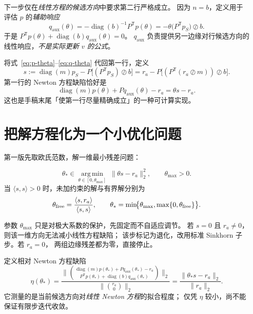 \documentclass[11pt,a4paper]{ctexart}
\newcommand{\diag}{\operatorname{diag}}
\newcommand{\trans}{\mathsf{T}}
\begin{document}
下一步仅在\emph{线性方程的候选方向}中要求第二行严格成立。
因为 $n=b$，定义用于评估 $p$ 的\emph{辅助响应}
\begin{equation}\label{eq:q-theta}
 q_{\mathrm{aux}}(\theta)=-\diag(b)^{-1}P^{\trans}p(\theta)
 =-\theta\bigl(P^{\trans}p_S\bigr)\oslash b.
\end{equation}
于是 $P^{\trans}p(\theta)+\diag(b)q_{\mathrm{aux}}(\theta)=0$。
$q_{\mathrm{aux}}$ 负责提供另一边缘对行候选方向的线性响应，\emph{不是实际更新 $v$ 的公式}。

将式~\eqref{eq:p-theta}--\eqref{eq:q-theta} 代回第一行，定义
\begin{equation}\label{eq:s}
 s:=\diag(m)p_S-P\bigl[(P^{\trans}p_S)\oslash b\bigr]
 =r_a-P\bigl[(P^{\trans}(r_a\oslash m))\oslash b\bigr].
\end{equation}
第一行的 Newton 方程缺陷恰好是
\begin{equation}\label{eq:defect}
 \diag(m)p(\theta)+Pq_{\mathrm{aux}}(\theta)-r_a
 =\theta s-r_a.
\end{equation}
这也是手稿末尾「使第一行尽量精确成立」的一种可计算实现。

\section{把解方程化为一个小优化问题}

第一版先取欧氏范数，解一维最小残差问题：
\begin{resultbox}
\begin{equation}\label{eq:ls}
 \boxed{\theta_*\in\underset{\theta\in[0,\theta_{\max}]}{\operatorname{arg\,min}}
  \;\|\theta s-r_a\|_2^2,\qquad \theta_{\max}>0.}
\end{equation}
当 $\langle s,s\rangle>0$ 时，未加约束的解与有界解分别为
\begin{equation}\label{eq:theta}
 \theta_{\rm free}=\frac{\langle s,r_a\rangle}{\langle s,s\rangle},
 \qquad
 \theta_*=\min\!\bigl\{\theta_{\max},
          \max\{0,\theta_{\rm free}\}\bigr\}.
\end{equation}
\end{resultbox}
参数 $\theta_{\max}$ 只是对极大系数的保护，先固定而不自适应调节。
若 $s=0$ 且 $r_a\ne0$，则该一维方向无法减小线性方程缺陷；
该步标记为退化，改用标准 Sinkhorn 子步。若 $r_a=0$，
两组边缘残差都为零，直接停止。

定义相对 Newton 方程缺陷
\begin{equation}\label{eq:eta}
 \eta(\theta_*)=
 \frac{\bigl\|\binom{\diag(m)p(\theta_*)+Pq_{\mathrm{aux}}(\theta_*)-r_a}
                        {P^{\trans}p(\theta_*)+\diag(b)q_{\mathrm{aux}}(\theta_*)}\bigr\|_2}
      {\|\binom{r_a}{0}\|_2}
 =\frac{\|\theta_*s-r_a\|_2}{\|r_a\|_2}.
\end{equation}
它测量的是当前候选方向对\emph{线性 Newton 方程}的拟合程度；
仅凭 $\eta$ 较小，尚不能保证有限步迭代收敛。
\end{document}

